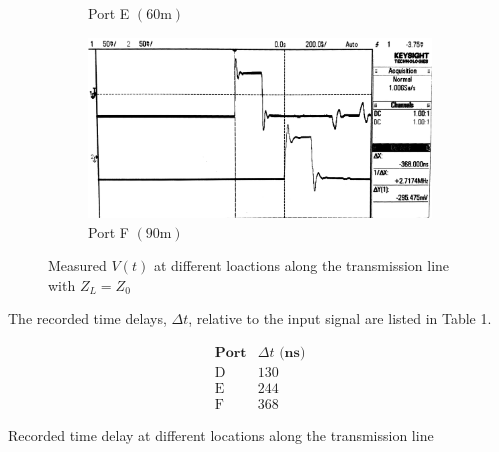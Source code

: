 \documentclass[10pt]{article}
\begin{document}
\begin{figure}[ht]
\begin{subfigure}[b]{0.45\textwidth}
        \caption{Port E $(60\text{m})$}
    \end{subfigure}
    \quad
    \begin{subfigure}[b]{0.45\textwidth}
        \includegraphics[width=\textwidth]{../photos/lab1/v_t_pt_f.jpg}
        \caption{Port F $(90\text{m})$}
    \end{subfigure}
    \caption{Measured $V(t)$ at different loactions along the transmission line with $Z_L = Z_0$ \vspace{-0.5cm}}
    \label{v_t_matched_tline}
\end{figure}

The recorded time delays, $\Delta t$, relative to the input signal are listed in Table 1.

\begin{table}[h]
    \[
        \begin{array}{c|c}
            \textbf{Port} & \Delta t \textbf{ (ns)} \\ \hline
            \text{D} & 130\\
            \text{E} & 244\\
            \text{F} & 368
        \end{array}
    \]
    \caption{Recorded time delay at different locations along the transmission line\vspace{-0.5cm}}
\end{table}


\end{document}
